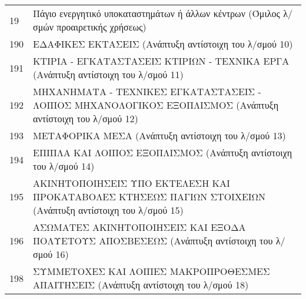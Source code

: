 \documentclass[A4,10pt,greek]{book}
\begin{document}
\begin{tabularx}{\linewidth}{lX}
19 & Πάγιο ενεργητικό υποκαταστημάτων ή άλλων κέντρων (Όμιλος λ/σμών προαιρετικής χρήσεως)\\
190 & ΕΔΑΦΙΚΕΣ ΕΚΤΑΣΕΙΣ (Ανάπτυξη αντίστοιχη του λ/σμού 10)\\
191 & ΚΤΙΡΙΑ - ΕΓΚΑΤΑΣΤΑΣΕΙΣ ΚΤΙΡΙΩΝ - ΤΕΧΝΙΚΑ ΕΡΓΑ (Ανάπτυξη αντίστοιχη του λ/σμού 11)\\
192 & ΜΗΧΑΝΗΜΑΤΑ - ΤΕΧΝΙΚΕΣ ΕΓΚΑΤΑΣΤΑΣΕΙΣ - ΛΟΙΠΟΣ ΜΗΧΑΝΟΛΟΓΙΚΟΣ ΕΞΟΠΛΙΣΜΟΣ (Ανάπτυξη αντίστοιχη του λ/σμού 12)\\
193 & ΜΕΤΑΦΟΡΙΚΑ ΜΕΣΑ (Ανάπτυξη αντίστοιχη του λ/σμού 13)\\
194 & ΕΠΙΠΛΑ ΚΑΙ ΛΟΙΠΟΣ ΕΞΟΠΛΙΣΜΟΣ (Ανάπτυξη αντίστοιχη του λ/σμού 14)\\
195 & ΑΚΙΝΗΤΟΠΟΙΗΣΕΙΣ ΥΠΟ ΕΚΤΕΛΕΣΗ ΚΑΙ ΠΡΟΚΑΤΑΒΟΛΕΣ ΚΤΗΣΕΩΣ ΠΑΓΙΩΝ ΣΤΟΙΧΕΙΩΝ (Ανάπτυξη αντίστοιχη του λ/σμού 15)\\
196 & ΑΣΩΜΑΤΕΣ ΑΚΙΝΗΤΟΠΟΙΗΣΕΙΣ ΚΑΙ ΕΞΟΔΑ ΠΟΛΥΕΤΟΥΣ ΑΠΟΣΒΕΣΕΩΣ (Ανάπτυξη αντίστοιχη του λ/σμού 16)\\
198 & ΣΥΜΜΕΤΟΧΕΣ ΚΑΙ ΛΟΙΠΕΣ ΜΑΚΡΟΠΡΟΘΕΣΜΕΣ ΑΠΑΙΤΗΣΕΙΣ (Ανάπτυξη αντίστοιχη του λ/σμού 18)\\

\end{tabularx}
\end{document}
